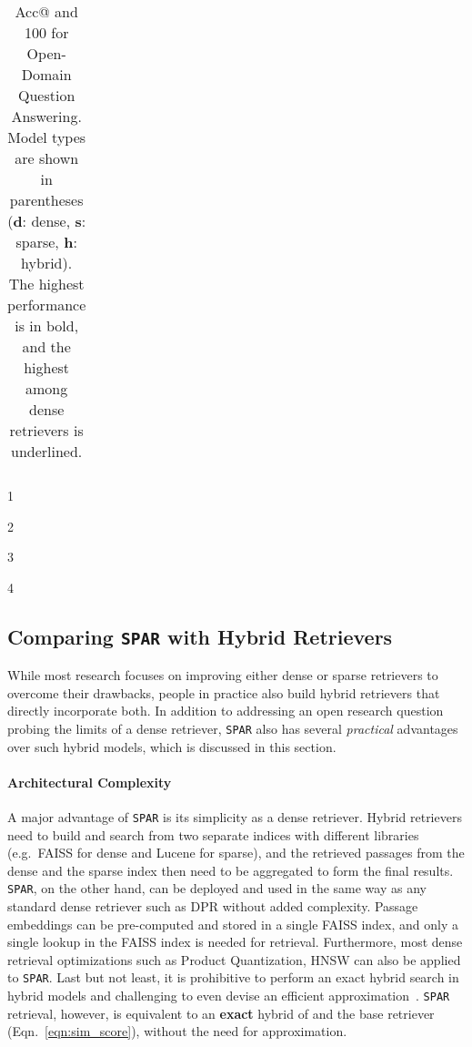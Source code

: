 \documentclass[11pt]{article}
\newcommand{\spar}{\texttt{SPAR}\xspace}
\newcommand{\lexmodelsymbol}{\xspace}
\begin{document}
\begin{table*}[ht]
\begin{threeparttable}
\begin{tabular} {l c cc c cc c cc c cc c cc c cc}
\bottomrule
\end{tabular}

\begin{tablenotes}
\item[1] \citep{yang-etal-2021-xmoco}
\item[2] \citep{xiong2021approximate}
\item[3] \citep{qu-etal-2021-rocketqa}
\item[4] \citep{ma2021replication}
\end{tablenotes}

\end{threeparttable}

\caption{Acc@ and 100 for Open-Domain Question Answering. Model types are shown in parentheses (\textbf{d}: dense, \textbf{s}: sparse, \textbf{h}: hybrid). The highest performance is in bold, and the highest among dense retrievers is underlined.}
\label{tab:odqa-results}
\end{table*}
 
\subsection{Comparing \spar{} with Hybrid Retrievers}\label{sec:spar_model:spar_vs_hybrid}

While most research focuses on improving either dense or sparse retrievers to overcome their drawbacks, people in practice also build hybrid retrievers that directly incorporate both.
In addition to addressing an open research question probing the limits of a dense retriever, \spar{} also has several \emph{practical} advantages over such hybrid models, which is discussed in this section.

\paragraph{Architectural Complexity}
A major advantage of \spar{} is its simplicity as a dense retriever.
Hybrid retrievers need to build and search from two separate indices with different libraries (e.g.~FAISS for dense and Lucene for sparse), and the retrieved passages from the dense and the sparse index then need to be aggregated to form the final results.
\spar{}, on the other hand, can be deployed and used in the same way as any standard dense retriever such as DPR without added complexity.
Passage embeddings can be pre-computed and stored in a single FAISS index, and only a single lookup in the FAISS index is needed for retrieval.
Furthermore, most dense retrieval optimizations such as Product Quantization, HNSW can also be applied to \spar{}.
Last but not least, it is prohibitive to perform an exact hybrid search in hybrid models and challenging to even devise an efficient approximation~\cite{wu2019efficient}.
\spar{} retrieval, however, is equivalent to an \textbf{exact} hybrid of \lexmodelsymbol{} and the base retriever (Eqn.~\ref{eqn:sim_score}), without the need for approximation.
\end{document}
